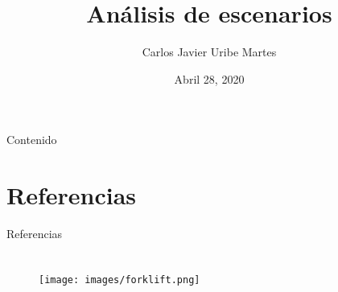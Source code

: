 \documentclass[xcolor=table, aspectratio=43]{beamer}
\title{Análisis de escenarios} %
\author[C.J. Uribe-Martes]{Carlos Javier Uribe Martes}
\institute[CUC]{
    Ingeniería Industrial%
    \\%
    Universidad de la Costa%
} %
\date{Abril 28, 2020}
\begin{document}
    
    \frame{\titlepage}
    
    \begin{frame}{Contenido}
        \tableofcontents
    \end{frame}
    
    
    
    
    
    
    
    

    

    \section*{Referencias} %
        \begin{frame}{Referencias}
            \printbibliography
        \end{frame}
     
    \section{}   
        \begin{frame}{}
            \begin{figure}
                \centering
                \texttt{[image: images/forklift.png]}
            \end{figure}
        \end{frame}
      
\end{document}
